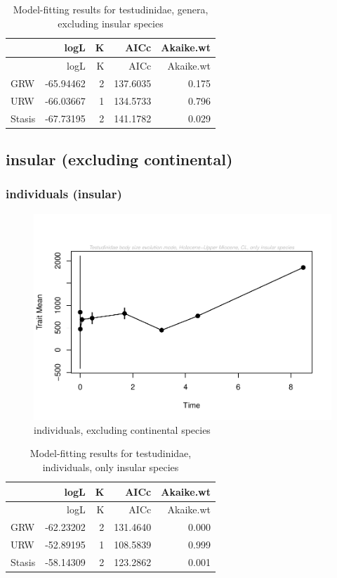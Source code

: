 \documentclass[]{article}
\begin{document}
\begin{longtable}[]{@{}lrrrr@{}}
\caption{Model-fitting results for testudinidae, genera, excluding
insular species}\tabularnewline
\toprule
& logL & K & AICc & Akaike.wt\tabularnewline
\midrule
\endfirsthead
\toprule
& logL & K & AICc & Akaike.wt\tabularnewline
\midrule
\endhead
GRW & -65.94462 & 2 & 137.6035 & 0.175\tabularnewline
URW & -66.03667 & 1 & 134.5733 & 0.796\tabularnewline
Stasis & -67.73195 & 2 & 141.1782 & 0.029\tabularnewline
\bottomrule
\end{longtable}

\newpage

\subsection{insular (excluding
continental)}\label{insular-excluding-continental}

\subsubsection{individuals (insular)}\label{individuals-insular}

\begin{figure}[htbp]
\centering
\includegraphics{MA_JJ_files/figure-latex/paleoTS, individuals, exluding continental species-1.pdf}
\caption{individuals, excluding continental species}
\end{figure}

\begin{longtable}[]{@{}lrrrr@{}}
\caption{Model-fitting results for testudinidae, individuals, only
insular species}\tabularnewline
\toprule
& logL & K & AICc & Akaike.wt\tabularnewline
\midrule
\endfirsthead
\toprule
& logL & K & AICc & Akaike.wt\tabularnewline
\midrule
\endhead
GRW & -62.23202 & 2 & 131.4640 & 0.000\tabularnewline
URW & -52.89195 & 1 & 108.5839 & 0.999\tabularnewline
Stasis & -58.14309 & 2 & 123.2862 & 0.001\tabularnewline
\bottomrule
\end{longtable}
\end{document}
